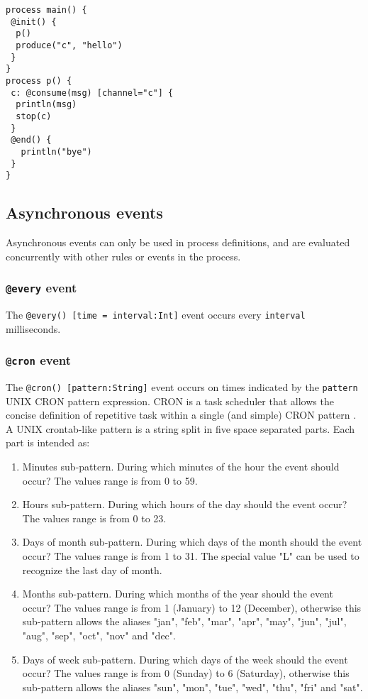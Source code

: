 \documentclass[11pt]{article}
\begin{document}
\begin{lstlisting}
process main() {
 @init() {
  p()
  produce("c", "hello")
 }
}
process p() {
 c: @consume(msg) [channel="c"] {
  println(msg)
  stop(c)
 }
 @end() {
   println("bye")
 }
}
\end{lstlisting}

\subsection{Asynchronous events\label{sec:asynchronous_events}}

Asynchronous events can only be used in process definitions, and are evaluated concurrently with other rules or events in the process. 

\subsubsection{\texttt{@every} event}

The \texttt{@every() [time = interval:Int]} event occurs every \texttt{interval} milliseconds.

\subsubsection{\texttt{@cron} event}

The \texttt{@cron() [pattern:String]} event occurs on times indicated by the \texttt{pattern} UNIX CRON pattern expression. CRON is a task scheduler that allows the concise definition of repetitive task within a single (and simple) CRON pattern \cite{franta1977}. A UNIX crontab-like pattern is a string split in five space separated parts. Each part is intended as:

\begin{enumerate}
\item Minutes sub-pattern. During which minutes of the hour the event should occur? The values range is from 0 to 59.
\item Hours sub-pattern. During which hours of the day should the event occur? The values range is from 0 to 23.
\item Days of month sub-pattern. During which days of the month should the event occur? The values range is from 1 to 31. The special value "L" can be used to recognize the last day of month.
\item Months sub-pattern. During which months of the year should the event occur? The values range is from 1 (January) to 12 (December), otherwise this sub-pattern allows the aliases "jan", "feb", "mar", "apr", "may", "jun", "jul", "aug", "sep", "oct", "nov" and "dec".
\item Days of week sub-pattern. During which days of the week should the event occur? The values range is from 0 (Sunday) to 6 (Saturday), otherwise this sub-pattern allows the aliases "sun", "mon", "tue", "wed", "thu", "fri" and "sat".
\end{enumerate}
\end{document}

